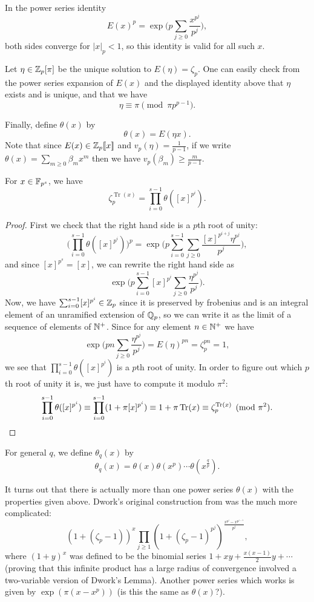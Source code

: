 \documentclass[letterpaper,11pt]{article}
\DeclareMathOperator{\Tr}{Tr}
\begin{document}
In the power series identity
\[
E(x)^p = \exp\Big(p\sum_{j \ge 0} \frac{x^{p^j}}{p^j}\Big),
\]
both sides converge for $|x|_p < 1$, so this identity is valid for all such $x$.

Let $\eta \in \mathbb{Z}_p[\pi]$ be the unique solution to $E(\eta) = \zeta_p$. One can easily check from the power series expansion of $E(x)$ and the displayed identity above that $\eta$ exists and is unique, and that we have
\[
\eta \equiv \pi \pmod{\pi p^{p-1}}.
\]

Finally, define $\theta(x)$ by
\[
\theta(x) = E(\eta x).
\]
Note that since $E(x) \in \mathbb{Z}_p[\![x]\!]$ and $v_p(\eta) = \frac{1}{p-1}$, if we write $\theta(x) = \sum_{m \ge 0} \beta_m x^m$ then we have $v_p(\beta_m) \ge \frac{m}{p-1}$.

\begin{lem} For $x \in \mathbb{F}_{p^s}$, we have
\[
\zeta_p^{\Tr(x)} = \prod_{i=0}^{s-1} \theta([x]^{p^i}).
\]
\end{lem}
\begin{proof} First we check that the right hand side is a $p$th root of unity:
\[
\Big(\prod_{i=0}^{s-1} \theta([x]^{p^i})\Big)^p = \exp\Big(p\sum_{i=0}^{s-1}\sum_{j \ge 0} \frac{[x]^{p^{i+j}}\eta^{p^j}}{p^j}\Big),
\]
and since $[x]^{p^s} = [x]$, we can rewrite the right hand side as
\[
\exp\Big(p\sum_{i=0}^{s-1} [x]^{p^i}\sum_{j \ge 0} \frac{\eta^{p^j}}{p^j}\Big).
\]
Now, we have $\sum_{i=0}^{s-1} [x]^{p^i} \in \mathbb{Z}_p$ since it is preserved by frobenius and is an integral element of an unramified extension of $\mathbb{Q}_p$, so we can write it as the limit of a sequence of elements of $\mathbb{N}^+$. Since for any element $n \in \mathbb{N}^+$ we have
\[
\exp\Big(pn\sum_{j \ge 0} \frac{\eta^{p^j}}{p^j}\Big) = E(\eta)^{pn} = \zeta_p^{pn} = 1,
\]
we see that $\prod_{i=0}^{s-1} \theta([x]^{p^i})$ is a $p$th root of unity. In order to figure out which $p$th root of unity it is, we just have to compute it modulo $\pi^2$:
\[
\prod_{i=0}^{s-1} \theta([x]^{p^i}) \equiv \prod_{i=0}^{s-1} (1 + \pi[x]^{p^i}) \equiv 1 + \pi\Tr(x) \equiv \zeta_p^{\Tr(x)} \pmod{\pi^2}.\qedhere
\]
\end{proof}

For general $q$, we define $\theta_q(x)$ by
\[
\theta_q(x) = \theta(x) \theta(x^p) \cdots \theta(x^{\tfrac{q}{p}}).
\]

It turns out that there is actually more than one power series $\theta(x)$ with the properties given above. Dwork's original construction from \cite{dwork} was the much more complicated:
\[
(1+(\zeta_p-1))^x\prod_{j \ge 1} (1+(\zeta_p-1)^{p^j})^{\frac{x^{p^j} - x^{p^{j-1}}}{p^j}},
\]
where $(1+y)^x$ was defined to be the binomial series $1 + xy + \frac{x(x-1)}{2}y + \cdots$ (proving that this infinite product has a large radius of convergence involved a two-variable version of Dwork's Lemma). Another power series which works is given by $\exp(\pi(x-x^p))$ (is this the same as $\theta(x)$?).
\end{document}
